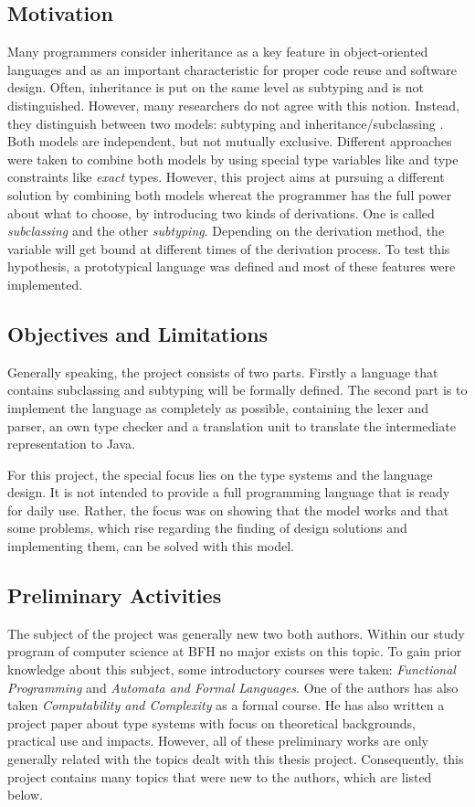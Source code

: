 \subsection{Motivation}
Many programmers consider inheritance as a key feature in object-oriented
languages and as an important characteristic for proper code reuse and
software design. Often, inheritance is put on the same level as subtyping
and is not distinguished. However, many researchers do not agree with
this notion. Instead, they distinguish between two models: subtyping and
inheritance/subclassing \cite{taivalsaari_notion_1996}.
Both models are independent, but not mutually exclusive. Different approaches were
taken to combine both models by using special type variables like \mytype
and type constraints like \emph{exact} types. However, this project aims at
pursuing a different solution by combining both models whereat the programmer has
the full power about what to choose, by introducing two kinds of derivations.
One is called \emph{subclassing} and the other \emph{subtyping}. Depending
on the derivation method, the \mytype variable will get bound at different
times of the derivation process. To test this hypothesis, a prototypical 
language was defined and most of these features were implemented.

\subsection{Objectives and Limitations}
Generally speaking, the project consists of two parts. Firstly a language
that contains subclassing and subtyping will be formally defined. The
second part is to implement the language as completely as possible, containing
the lexer and parser, an own type checker and a translation unit to translate
the intermediate representation to Java.

For this project, the special focus lies on the type systems and the language
design. It is not intended to provide a full programming language that is
ready for daily use. Rather, the focus was on showing that the model works and that some
problems, which rise regarding the finding of design solutions and implementing them, can be solved
with this model.

\subsection{Preliminary Activities}
The subject of the project was generally new two both authors. Within
our study program of computer science at BFH no major exists on this topic. To gain prior
knowledge about this subject, some introductory courses were taken:
\emph{Functional Programming} and \emph{Automata and Formal Languages}.
One of the authors has also taken \emph{Computability and Complexity} as
a formal course. He has also written a project paper about type systems
with focus on theoretical backgrounds, practical use and impacts. However, all
of these preliminary works are only generally related with the topics dealt with
this thesis project. Consequently, this project contains many topics that
were new to the authors, which are listed below.

